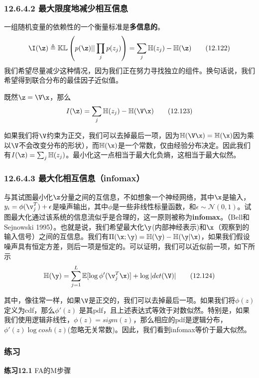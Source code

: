 \documentclass[a4paper]{article}
\begin{document}
\subsubsection*{12.6.4.2  最大限度地减少相互信息}
一组随机变量的依赖性的一个衡量标准是\textbf{多信息的}。
\begin{equation}
	\I(\z)\triangleq\mathbb{K}\mathbb{L}\left(p(\z)||\prod_j p(z_j)\right)=\sum_j\mathbb{H}(z_j)-\mathbb{H}(\z)\tag{12.122}
\end{equation}
我们希望尽量减少这种情况，因为我们正在努力寻找独立的组件。换句话说，我们希望得到联合分布的最佳因子近似值。 

既然$\z=\V\x$，那么 
\begin{equation}
	\mathit{I}(\z)=\sum_j\mathbb{H}(z_j)-\mathbb{H}(\V\x)\tag{12.123}
\end{equation}

如果我们将$\V$约束为正交，我们可以去掉最后一项，因为$\mathbb{H}(\V\x)=\mathbb{H}(\x)$因为乘以$\V$不会改变分布的形状），而$\mathbb{H}(\x)$是一个常数，仅由经验分布决定。因此我们有$\mathit{I}(\z)=\sum_j\mathbb{H}(z_j)$。最小化这一点相当于最大化负熵，这相当于最大似然。 

\subsubsection*{12.6.4.3 最大化相互信息（infomax）}
与其试图最小化$\z$分量之间的互信息，不如想象一个神经网络，其中$\x$是输入，$y_i=\phi (\v_j^T)+\epsilon$是噪声输出，其中$\phi$是一些非线性标量函数，和$\epsilon\sim \mathcal{N}(0,1)$。试图最大化通过该系统的信息流似乎是合理的，这一原则被称为\textbf{infomax}。（Bell和Sejnowski 1995）。也就是说，我们希望最大化$\y$(内部神经表示)和$\x$（观察到的输入信号）之间的互信息。我们有$\Pi(\x;\y)=\mathbb{H}(\y)-\mathbb{H}(\y|\x)$，如果我们假设噪声具有恒定方差，则后一项是恒定的。可以证明，我们可以近似前一项，如下所示 
\begin{equation}
	\mathbb{H}(\y)=\sum_{j=1}^{L}\mathbb{E}[\log \phi'(\v_j^T\x)]+\log |det(\V)|\tag{12.124}
\end{equation}

其中，像往常一样，如果$\V$是正交的，我们可以去掉最后一项。如果我们将$\phi(z)$定义为cdf，那么$\phi'(z)$ 是其pdf，且上述表达式等效于对数似然。特别是，如果我们使用逻辑非线性，$\phi(z)=sigm(z)$，那么相应的pdf是逻辑分布，$\phi'(z)\log cosh(z)$(忽略无关常数)。因此，我们看到infomax等价于最大似然。 

\subsubsection*{练习}
\textbf{练习12.1}  FA的M步骤
\end{document}
